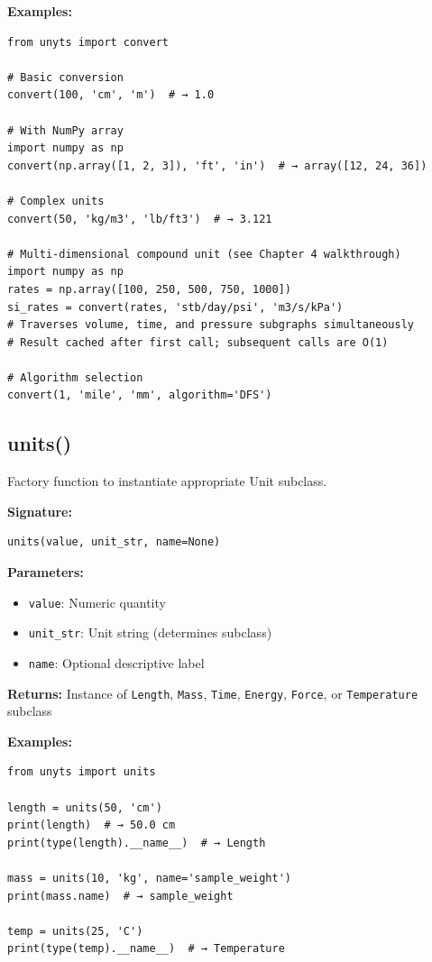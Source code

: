 \documentclass[11pt,a4paper]{report}
\begin{document}
\textbf{Examples:}
\begin{lstlisting}[style=pythonstyle]
from unyts import convert

# Basic conversion
convert(100, 'cm', 'm')  # → 1.0

# With NumPy array
import numpy as np
convert(np.array([1, 2, 3]), 'ft', 'in')  # → array([12, 24, 36])

# Complex units
convert(50, 'kg/m3', 'lb/ft3')  # → 3.121

# Multi-dimensional compound unit (see Chapter 4 walkthrough)
import numpy as np
rates = np.array([100, 250, 500, 750, 1000])
si_rates = convert(rates, 'stb/day/psi', 'm3/s/kPa')
# Traverses volume, time, and pressure subgraphs simultaneously
# Result cached after first call; subsequent calls are O(1)

# Algorithm selection
convert(1, 'mile', 'mm', algorithm='DFS')
\end{lstlisting}

\subsection{units()}

Factory function to instantiate appropriate Unit subclass.

\textbf{Signature:}
\begin{lstlisting}[style=pythonstyle]
units(value, unit_str, name=None)
\end{lstlisting}

\textbf{Parameters:}
\begin{itemize}
\item \texttt{value}: Numeric quantity
\item \texttt{unit\_str}: Unit string (determines subclass)
\item \texttt{name}: Optional descriptive label
\end{itemize}

\textbf{Returns:} Instance of \texttt{Length}, \texttt{Mass}, \texttt{Time}, \texttt{Energy}, \texttt{Force}, or \texttt{Temperature} subclass

\textbf{Examples:}
\begin{lstlisting}[style=pythonstyle]
from unyts import units

length = units(50, 'cm')
print(length)  # → 50.0 cm
print(type(length).__name__)  # → Length

mass = units(10, 'kg', name='sample_weight')
print(mass.name)  # → sample_weight

temp = units(25, 'C')
print(type(temp).__name__)  # → Temperature
\end{lstlisting}
\end{document}
